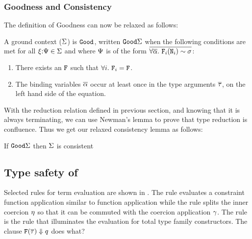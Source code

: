 \documentclass[format=acmsmall,manuscript,review,screen,nonacm,margin=1in,11pt]{acmart}
\begin{document}
\subsubsection{Goodness and Consistency}\label{subsubsec:tf-constrained-goodness-consistency}
The definition of Goodness can now be relaxed as follows:
\begin{property}
  A ground context ($\Sigma$) is $\texttt{Good}$, written $\texttt{Good}\Sigma$ when
  the following conditions are met for all $\xi{:}\Psi\in\Sigma$ and
  where $\Psi$ is of the form $\overline{\forall\overline{\alpha}.~\texttt{F}_i(\texttt{N}_i)\mathrel{\sim}\sigma}$:
  \begin{enumerate}
  \item There exists an $\texttt{F}$ such that  $\forall i.~\texttt{F}_i = \texttt{F}$.
  \item The binding variables $\overline{\alpha}$ occur at least once in the type arguments $\overline{\tau}$,
    on the left hand side of the equation.
  \end{enumerate}
\end{property}
With the reduction relation defined in previous section, and knowing that it is always terminating,
we can use Newman's lemma to prove that type reduction is confluence. Thus we get our relaxed consistency lemma as follows:
\begin{lemma}[Consistency] If $\texttt{Good}\Sigma$ then $\Sigma$ is consistent \end{lemma}

\subsection{Type safety of \QLTF}\label{subsec:tf-constrained-safety} 
\newcommand\TQPush{
  \ib{\irule[\trule{t-qpush}]
    {\substack {{v = \Lam c \Preds \Tm}\\
        {\MoreCo_0 = \nth 0 \MoreCo}}}
    {\substack {{\MoreCo_1 = \sym{\nth 1 \MoreCo}}\\
        {\MoreCo_2 = \nth 2 \MoreCo}}};
    {\stepsto {(\cast v \MoreCo)\App \Co} {\cast {v\App(\comp{\comp{\MoreCo_0}{\Co}}{\MoreCo_1})} \MoreCo_2}}
  }
  }

\newcommand\TQResolve{
  \ib{\irule[\trule{t-qres}]
    {\chi = (\alpha|c\co\FamCtrs(\many\tau)\teq\alpha)}
    {\FamCtrs(\many\tau) \Downarrow q};
    {\stepsto {\tassume\chi\Tm} {e[\chi/q]}}}
}

\newcommand\TQBeta{
  \ib{\irule[\trule{t-c$\beta$}];
    {\stepsto {(\Lam c \Preds \Tm)\App\Co } {\Tm[c/\Co]}}}
}
Selected rules for term evaluation are shown in .
The rule  evaluates a constraint function application similar to function application
while the rule  splits the inner coercion $\eta$ so that it can be commuted with
the coercion application $\gamma$. The rule  is the rule that illuminates the evaluation
for total type family constructors. The clause $\texttt{F}(\overline{\tau}) \Downarrow q$ does what? 
\end{document}
